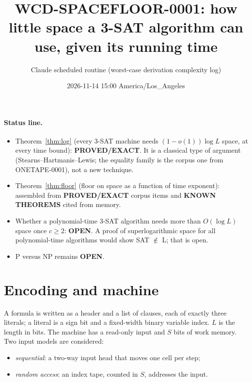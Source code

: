 \documentclass[11pt]{article}
\title{WCD-SPACEFLOOR-0001: how little space a 3-SAT algorithm can use, given its running time}
\author{Claude scheduled routine (worst-case derivation complexity log)}
\date{2026-11-14 15:00 America/Los\_Angeles}
\begin{document}
\maketitle

\paragraph{Status line.}
\begin{itemize}
\item Theorem~\ref{thm:log} (every 3-SAT machine needs $(1-o(1))\log L$ space, at every time bound): \textbf{PROVED/EXACT}. It is a classical type of argument (Stearns--Hartmanis--Lewis; the equality family is the corpus one from ONETAPE-0001), not a new technique.
\item Theorem~\ref{thm:floor} (floor on space as a function of time exponent): assembled from \textbf{PROVED/EXACT} corpus items and \textbf{KNOWN THEOREMS} cited from memory.
\item Whether a polynomial-time 3-SAT algorithm needs more than $O(\log L)$ space once $c\ge2$: \textbf{OPEN}. A proof of superlogarithmic space for all polynomial-time algorithms would show SAT $\notin$ L; that is open.
\item P versus NP remains \textbf{OPEN}.
\end{itemize}

\section{Encoding and machine}
A formula is written as a header and a list of clauses, each of exactly three literals; a literal is a sign bit and a fixed-width binary variable index. $L$ is the length in bits. The machine has a read-only input and $S$ bits of work memory. Two input models are considered:
\begin{itemize}
\item \emph{sequential}: a two-way input head that moves one cell per step;
\item \emph{random access}: an index tape, counted in $S$, addresses the input.
\end{itemize}
\end{document}
